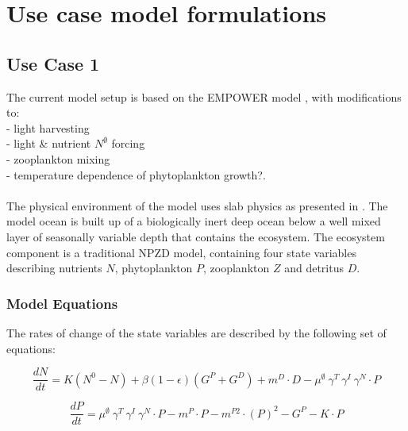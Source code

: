 \documentclass[template.tex]{subfiles}
\begin{document}
\section{Use case model formulations}
%
%
%
%
%
%

\subsection{Use Case 1}
The current model setup is based on the EMPOWER model \citep{Anderson2015c}, with modifications to:\\ 
- light harvesting\\ 
- light & nutrient $N^\emptyset$ forcing\\ 
- zooplankton mixing\\ 
- temperature dependence of phytoplankton growth?.\\ 

\\ 
The physical environment of the model uses slab physics as presented in \citet{Evans1985ACycles}. The model ocean is built up of a biologically inert deep ocean below a well mixed layer of seasonally variable depth that contains the ecosystem. The ecosystem component is a traditional NPZD model, containing four state variables describing nutrients $N$, phytoplankton $P$, zooplankton $Z$ and detritus $D$.
\subsubsection{Model Equations}
The rates of change of the state variables are described by the following set of equations:

\begin{equation}
    \frac{d N}{d t} = 
    K (N^0 - N) %
    + \beta(1 - \epsilon)(G^P + G^D) %
    + m^D \cdot D %
    - \mu^{\emptyset} \ \gamma^{T} \ \gamma^{I} \ \gamma^{N} \cdot P %
\end{equation}

\begin{equation}
    \frac{d P}{d t} =
    \mu^{\emptyset} \ \gamma^{T} \ \gamma^{I} \ \gamma^{N} \cdot P  %
    - m^P \cdot P %
    - m^{P2} \cdot (P)^2 %
    - G^P %
    - K \cdot P %
\end{equation}
\end{document}

